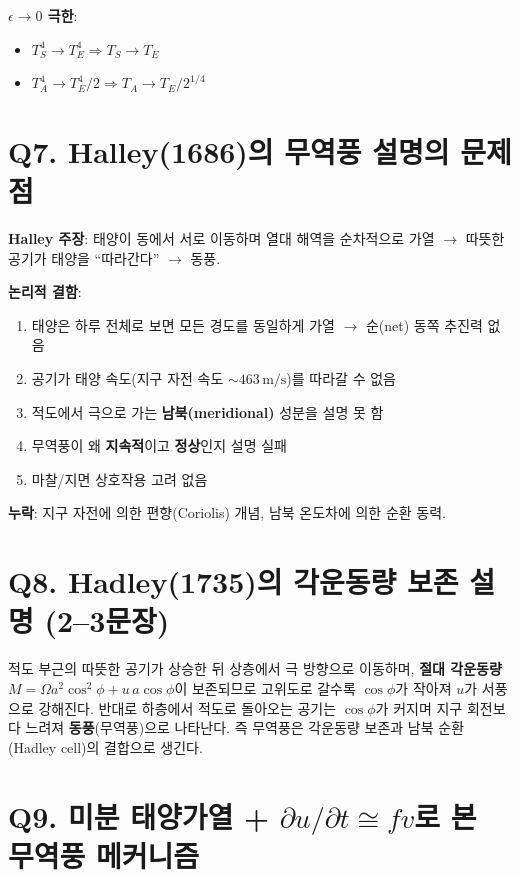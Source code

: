 \documentclass[11pt,a4paper]{article}
\begin{document}
\textbf{$\epsilon \to 0$ 극한}:
\begin{itemize}
    \item $T_S^4 \to T_E^4 \Rightarrow T_S \to T_E$ \checkmark
    \item $T_A^4 \to T_E^4/2 \Rightarrow T_A \to T_E/2^{1/4}$ \checkmark
\end{itemize}

\section*{Q7. Halley(1686)의 무역풍 설명의 문제점}

\textbf{Halley 주장}: 태양이 동에서 서로 이동하며 열대 해역을 순차적으로 가열 $\to$ 따뜻한 공기가 태양을 ``따라간다'' $\to$ 동풍.

\textbf{논리적 결함}:
\begin{enumerate}
    \item 태양은 하루 전체로 보면 모든 경도를 동일하게 가열 $\to$ 순(net) 동쪽 추진력 없음
    \item 공기가 태양 속도(지구 자전 속도 $\sim 463\,\mathrm{m/s}$)를 따라갈 수 없음
    \item 적도에서 극으로 가는 \textbf{남북(meridional)} 성분을 설명 못 함
    \item 무역풍이 왜 \textbf{지속적}이고 \textbf{정상}인지 설명 실패
    \item 마찰/지면 상호작용 고려 없음
\end{enumerate}

\textbf{누락}: 지구 자전에 의한 편향(Coriolis) 개념, 남북 온도차에 의한 순환 동력.

\section*{Q8. Hadley(1735)의 각운동량 보존 설명 (2--3문장)}

적도 부근의 따뜻한 공기가 상승한 뒤 상층에서 극 방향으로 이동하며, \textbf{절대 각운동량} $M = \Omega a^2 \cos^2\phi + u\,a\cos\phi$이 보존되므로 고위도로 갈수록 $\cos\phi$가 작아져 $u$가 서풍으로 강해진다. 반대로 하층에서 적도로 돌아오는 공기는 $\cos\phi$가 커지며 지구 회전보다 느려져 \textbf{동풍}(무역풍)으로 나타난다. 즉 무역풍은 각운동량 보존과 남북 순환(Hadley cell)의 결합으로 생긴다.

\section*{Q9. 미분 태양가열 + $\partial u/\partial t \cong fv$로 본 무역풍 메커니즘}
\end{document}

